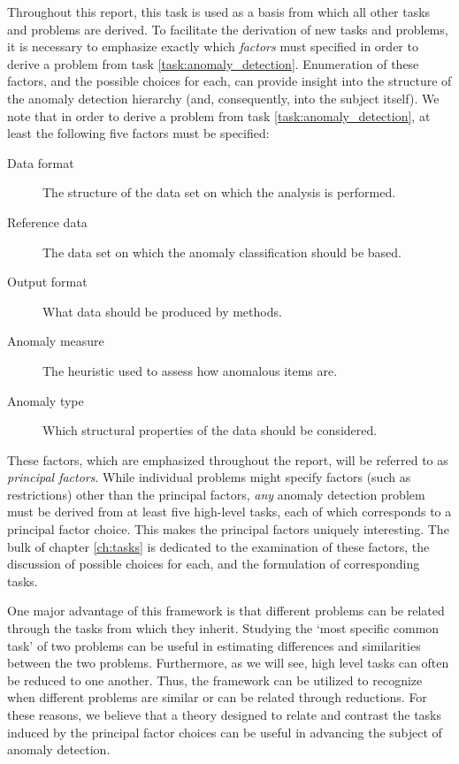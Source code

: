 Throughout this report, this task is used as a basis from which all other tasks and problems are derived. To facilitate the derivation of new tasks and problems, it is necessary to emphasize exactly which \emph{factors} must specified in order to derive a problem from task \ref{task:anomaly_detection}. Enumeration of these factors, and the possible choices for each, can provide insight into the structure of the anomaly detection hierarchy (and, consequently, into the subject itself). We note that in order to derive a problem from task \ref{task:anomaly_detection}, at least the following five factors must be specified:
\begin{description}
  \item[Data format] The structure of the data set on which the analysis is performed.
  \item[Reference data] The data set on which the anomaly classification should be based.
  \item[Output format] What data should be produced by methods.
  \item[Anomaly measure] The heuristic used to assess how anomalous items are.
  \item[Anomaly type] Which structural properties of the data should be considered. 
\end{description}
These factors, which are emphasized throughout the report, will be referred to as \emph{principal factors}. While individual problems might specify factors (such as restrictions) other than the principal factors, \emph{any} anomaly detection problem must be derived from at least five high-level tasks, each of which corresponds to a principal factor choice. This makes the principal factors uniquely interesting. The bulk of chapter \ref{ch:tasks} is dedicated to the examination of these factors, the discussion of possible choices for each, and the formulation of corresponding tasks.

One major advantage of this framework is that different problems can be related through the tasks from which they inherit. Studying the `most specific common task' of two problems can be useful in estimating differences and similarities between the two problems. Furthermore, as we will see, high level tasks can often be reduced to one another. Thus, the framework can be utilized to recognize when different problems are similar or can be related through reductions. For these reasons, we believe that a theory designed to relate and contrast the tasks induced by the principal factor choices can be useful in advancing the subject of anomaly detection.

